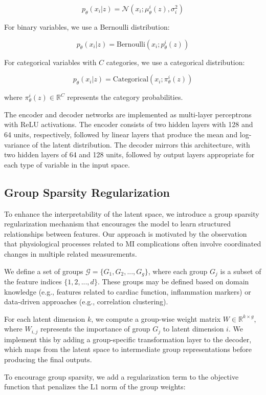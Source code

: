 \documentclass[oupdraft]{bio}
\begin{document}
$$p_\theta(x_i|z) = \mathcal{N}(x_i; \mu_\theta^i(z), \sigma^2_i)$$

For binary variables, we use a Bernoulli distribution:

$$p_\theta(x_i|z) = \text{Bernoulli}(x_i; p_\theta^i(z))$$

For categorical variables with $C$ categories, we use a categorical distribution:

$$p_\theta(x_i|z) = \text{Categorical}(x_i; \pi_\theta^i(z))$$

where $\pi_\theta^i(z) \in \mathbb{R}^C$ represents the category probabilities.

The encoder and decoder networks are implemented as multi-layer perceptrons with ReLU activations. The encoder consists of two hidden layers with 128 and 64 units, respectively, followed by linear layers that produce the mean and log-variance of the latent distribution. The decoder mirrors this architecture, with two hidden layers of 64 and 128 units, followed by output layers appropriate for each type of variable in the input space.

\subsection{Group Sparsity Regularization}

To enhance the interpretability of the latent space, we introduce a group sparsity regularization mechanism that encourages the model to learn structured relationships between features. Our approach is motivated by the observation that physiological processes related to MI complications often involve coordinated changes in multiple related measurements.

We define a set of groups $\mathcal{G} = \{G_1, G_2, ..., G_g\}$, where each group $G_j$ is a subset of the feature indices $\{1, 2, ..., d\}$. These groups may be defined based on domain knowledge (e.g., features related to cardiac function, inflammation markers) or data-driven approaches (e.g., correlation clustering).

For each latent dimension $k$, we compute a group-wise weight matrix $W \in \mathbb{R}^{k \times g}$, where $W_{i,j}$ represents the importance of group $G_j$ to latent dimension $i$. We implement this by adding a group-specific transformation layer to the decoder, which maps from the latent space to intermediate group representations before producing the final outputs.

To encourage group sparsity, we add a regularization term to the objective function that penalizes the L1 norm of the group weights:
\end{document}

